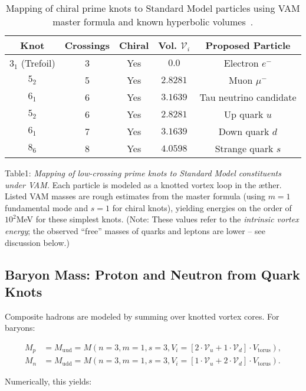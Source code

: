 \begin{table}[H]
\centering
\begin{tabular}{|c|c|c|c|c|}
\hline
\textbf{Knot} & \textbf{Crossings} & \textbf{Chiral} & \textbf{Vol.} $\mathcal{V}_i$ & \textbf{Proposed Particle} \\
\hline
$3_1$ (Trefoil)   & 3 & Yes  & $0.0$     & Electron $e^-$ \\
$5_2$             & 5 & Yes  & $2.8281$  & Muon $\mu^-$ \\
$6_1$             & 6 & Yes  & $3.1639$  & Tau neutrino candidate \\
$5_2$             & 6 & Yes  & $2.8281$  & Up quark $u$ \\
$6_1$             & 7 & Yes  & $3.1639$  & Down quark $d$ \\
$8_6$             & 8 & Yes  & $4.0598$  & Strange quark $s$ \\
\hline
\end{tabular}
\caption{Mapping of chiral prime knots to Standard Model particles using VAM master formula and known hyperbolic volumes~\cite{KnotAtlas}.}
\label{tab:knot_to_particle}
\end{table}


Table1: \textit{Mapping of low-crossing prime knots to Standard Model constituents under VAM.} Each particle is modeled as a knotted vortex loop in the æther. Listed VAM masses are rough estimates from the master formula (using $m=1$ fundamental mode and $s=1$ for chiral knots), yielding energies on the order of $10^2$MeV for these simplest knots. (Note: These values refer to the \textit{intrinsic vortex energy}; the observed “free” masses of quarks and leptons are lower – see discussion below.)


\subsection{Baryon Mass: Proton and Neutron from Quark Knots}

Composite hadrons are modeled by summing over knotted vortex cores. For baryons:

\begin{align}
M_p &= M_{\text{uud}} = M(n=3, m=1, s=3, V_i = [2\cdot \mathcal{V}_u + 1 \cdot \mathcal{V}_d]\cdot V_{\text{torus}}), \\
M_n &= M_{\text{udd}} = M(n=3, m=1, s=3, V_i = [1\cdot \mathcal{V}_u + 2 \cdot \mathcal{V}_d]\cdot V_{\text{torus}}).
\end{align}

Numerically, this yields:

